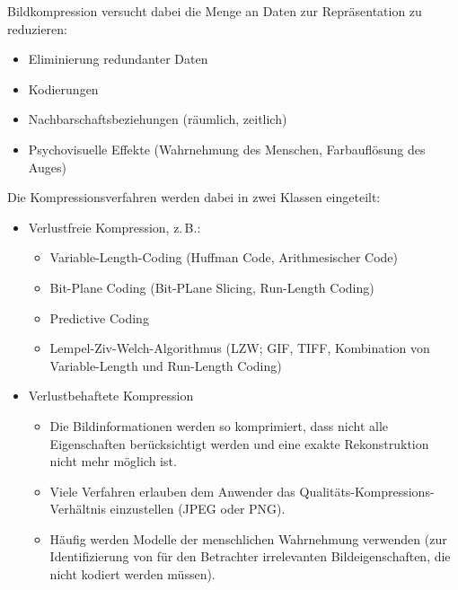 		Bildkompression versucht dabei die Menge an Daten zur Repräsentation zu reduzieren:
		\begin{itemize}
			\item Eliminierung redundanter Daten
			\item Kodierungen
			\item Nachbarschaftsbeziehungen (räumlich, zeitlich)
			\item Psychovisuelle Effekte (Wahrnehmung des Menschen, Farbauflösung des Auges)
		\end{itemize}
		Die Kompressionsverfahren werden dabei in zwei Klassen eingeteilt:
		\begin{itemize}
			\item Verlustfreie Kompression, z.\,B.:
				\begin{itemize}
					\item Variable-Length-Coding (Huffman Code, Arithmesischer Code)
					\item Bit-Plane Coding (Bit-PLane Slicing, Run-Length Coding)
					\item Predictive Coding
					\item Lempel-Ziv-Welch-Algorithmus (LZW; GIF, TIFF, Kombination von Variable-Length und Run-Length Coding)
				\end{itemize}
			\item Verlustbehaftete Kompression
				\begin{itemize}
					\item Die Bildinformationen werden so komprimiert, dass nicht alle Eigenschaften berücksichtigt werden und eine exakte Rekonstruktion \ggf nicht mehr möglich ist.
					\item Viele Verfahren erlauben dem Anwender das Qualitäts-Kompressions-Verhältnis einzustellen (\zB JPEG oder PNG).
					\item Häufig werden Modelle der menschlichen Wahrnehmung verwenden (zur Identifizierung von für den Betrachter irrelevanten Bildeigenschaften, die nicht kodiert werden müssen).
				\end{itemize}
		\end{itemize}

